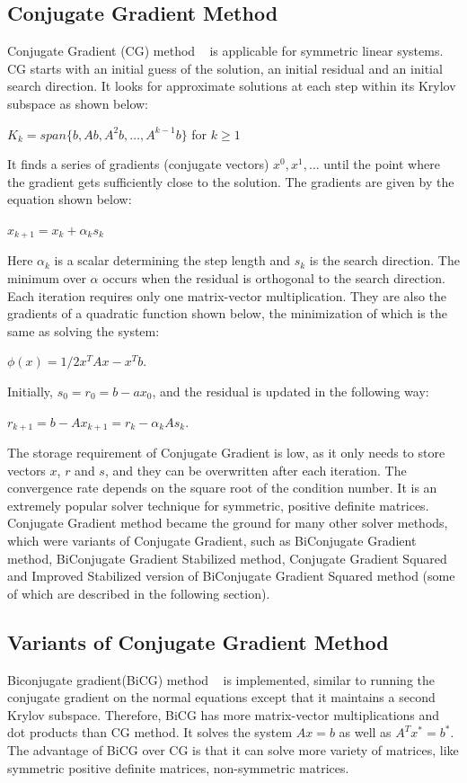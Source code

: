 \subsection{Conjugate Gradient Method}
Conjugate Gradient (CG) method ~\cite{cg1,cg2,cg3} is applicable for symmetric linear systems. CG starts with an initial guess of the
solution, an initial residual and an initial search direction. It looks for approximate solutions at each step within its Krylov subspace as shown below: 
\begin{center}
${K}_{k} = span\{b,Ab,A^{2}b,\ldots,A^{k-1}b\}$ for $k \geq 1$
\end{center}
It finds a series of gradients (conjugate vectors) $x^{0}, x^{1}, \ldots$ until the point where the gradient gets sufficiently close to the solution. The gradients are given by the equation shown below: 
\begin{center}
$x_{k+1} = x_{k} + \alpha_k s_k$
\end{center}  
Here $\alpha_k$ is a scalar determining the step length and $ s_k$ is the search direction. The minimum over $\alpha $ occurs when the residual is orthogonal to the search direction. Each iteration requires only one matrix-vector multiplication. They are also the gradients of a quadratic function shown below, the minimization of which is the same as solving the system:
\begin{center}
$\phi(x) = 1/2 x^{T}Ax - x^{T} b $.
\end{center}
Initially, $s_0 = r_0 = b - ax_0$, and the residual is updated in the following way:
\begin{center}
$r_{k+1} = b - Ax_{k+1} = r_k - \alpha_k A s_k$.
\end{center}
The storage requirement of Conjugate Gradient is low, as it only needs to store vectors $x$, $r$ and $s$, and they can be overwritten after each iteration. The convergence rate depends on the square root of the condition number. It is an extremely popular solver technique for symmetric, positive definite matrices. Conjugate Gradient method became the ground for many other solver methods, which were variants of Conjugate Gradient, such as BiConjugate Gradient method, BiConjugate Gradient Stabilized method, Conjugate Gradient Squared and Improved Stabilized version of BiConjugate Gradient Squared method (some of which are described in the following section).

\subsection{Variants of Conjugate Gradient Method}
Biconjugate gradient(BiCG) method ~\cite{bicg1} is implemented, similar to running the conjugate gradient on the normal equations except that it maintains a second Krylov subspace. Therefore, BiCG has more matrix-vector multiplications and dot products than CG method. It solves the system $Ax = b$ as well as $A^Tx^* = b^*.$ The advantage of BiCG over CG is that it can solve more variety of matrices, like symmetric positive definite matrices, non-symmetric matrices.

